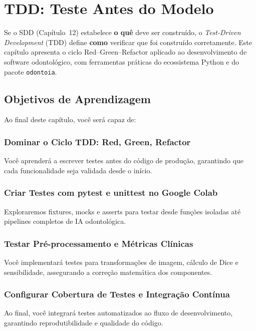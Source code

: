 \chapter{TDD: Teste Antes do Modelo}
\label{cap:tdd-python}
\niveltres

Se o SDD (Capítulo~12) estabelece \textbf{o quê} deve ser construído,
o \textit{Test-Driven Development} (TDD) define \textbf{como} verificar
que foi construído corretamente. Este capítulo apresenta o ciclo
Red--Green--Refactor aplicado ao desenvolvimento de software odontológico,
com ferramentas práticas do ecossistema Python e do pacote \texttt{odontoia}.

\section{Objetivos de Aprendizagem}

Ao final deste capítulo, você será capaz de:

\subsection{Dominar o Ciclo TDD: Red, Green, Refactor}
Você aprenderá a escrever testes antes do código de produção, garantindo que cada funcionalidade seja validada desde o início.

\subsection{Criar Testes com pytest e unittest no Google Colab}
Exploraremos fixtures, mocks e asserts para testar desde funções isoladas até pipelines completos de IA odontológica.

\subsection{Testar Pré-processamento e Métricas Clínicas}
Você implementará testes para transformações de imagem, cálculo de Dice e sensibilidade, assegurando a correção matemática dos componentes.

\subsection{Configurar Cobertura de Testes e Integração Contínua}
Ao final, você integrará testes automatizados ao fluxo de desenvolvimento, garantindo reprodutibilidade e qualidade do código.

